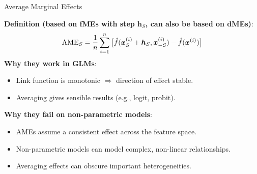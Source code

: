 \documentclass[10pt,compress,t,notes=noshow, xcolor=table]{beamer}
\begin{document}
\begin{frame}{Average Marginal Effects}


\textbf{Definition (based on fMEs with step $\bm h_S$, can also be based on dMEs)}:
$$\text{AME}_S = \frac{1}{n} \sum_{i=1}^n \big[\hat{f}(\bm x_S^{(i)} + \bm h_S, \bm x_{-S}^{(i)}) - \hat{f}(\bm x^{(i)})\big]$$
\textbf{Why they work in GLMs}:
\begin{itemize}\setlength\itemsep{0.25em}
\item Link function is monotonic $\Rightarrow$ direction of effect stable.
\item Averaging gives sensible results (e.g., logit, probit).
\end{itemize}

\vspace{0.2em}
\textbf{Why they fail on non-parametric models}:
\begin{itemize}%
\item AMEs assume a consistent effect across the feature space.
\item Non-parametric models can model complex, non-linear relationships.
\item Averaging effects can obscure important heterogeneities.
\end{itemize}


\end{frame}
\end{document}

